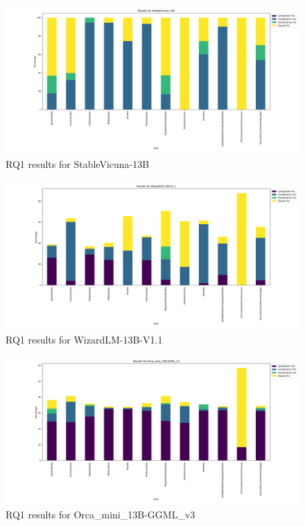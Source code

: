 \begin{figure}
\centering
\includegraphics[width=1\textwidth]{images/RQ1_vicuna.png}
\caption{RQ1 results for StableVicuna-13B}
\label{fig:rq1_vicuna}
\end{figure}

\begin{figure}
\centering
\includegraphics[width=1\textwidth]{images/RQ1_wizlm.png}
\caption{RQ1 results for WizardLM-13B-V1.1}
\label{fig:rq1_wizlm}
\end{figure}

\begin{figure}
\centering
\includegraphics[width=1\textwidth]{images/RQ1_orca.png}
\caption{RQ1 results for Orca\_mini\_13B-GGML\_v3}
\label{fig:rq1_orca}
\end{figure}

